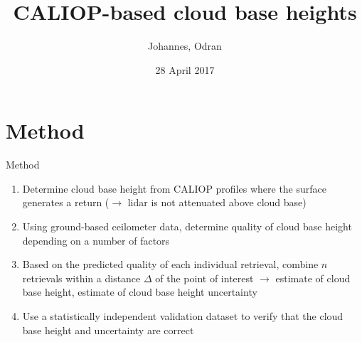 \documentclass[10pt,notes=all,aspectratio=1610]{beamer}\usepackage[]{graphicx}\usepackage[]{color}
\title{CALIOP-based cloud base heights} \subtitle{} \date{28 April 2017}
\author{Johannes, Odran}
\begin{document}
\begin{frame}
  \titlepage
\end{frame}

  


\section{Method}
\begin{frame}{Method}
  \begin{enumerate}
  \item Determine cloud base height from CALIOP profiles where the surface
    generates a return ($\longrightarrow$ lidar is not attenuated above cloud
    base)
  \item Using ground-based ceilometer data, determine quality of cloud base
    height depending on a number of factors
  \item Based on the predicted quality of each individual retrieval, combine $n$
    retrievals within a distance $\Delta$ of the point of interest
    $\longrightarrow$ estimate of cloud base height, estimate of cloud base
    height uncertainty
  \item Use a statistically independent validation dataset to verify that the
    cloud base height and uncertainty are correct
  \end{enumerate}
\end{frame}


\end{document}
